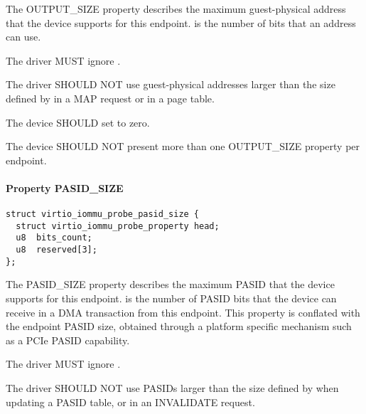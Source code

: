The OUTPUT_SIZE property describes the maximum guest-physical
address that the device supports for this endpoint.
 is the number of bits that an address can use.


The driver MUST ignore .

The driver SHOULD NOT use guest-physical addresses larger than
the size defined by  in a MAP request or in a
page table.


The device SHOULD set  to zero.

The device SHOULD NOT present more than one OUTPUT_SIZE property
per endpoint.


\paragraph{Property PASID_SIZE}\label{sec:Device Types / IOMMU Device / Device operations / PROBE properties / PASID_SIZE}

\begin{lstlisting}
struct virtio_iommu_probe_pasid_size {
  struct virtio_iommu_probe_property head;
  u8  bits_count;
  u8  reserved[3];
};
\end{lstlisting}

The PASID_SIZE property describes the maximum PASID that the
device supports for this endpoint.  is the
number of PASID bits that the device can receive in a DMA
transaction from this endpoint. This property is conflated with
the endpoint PASID size, obtained through a platform specific
mechanism such as a PCIe PASID capability.


The driver MUST ignore .

The driver SHOULD NOT use PASIDs larger than the size defined by
 when updating a PASID table, or in an
INVALIDATE request.


